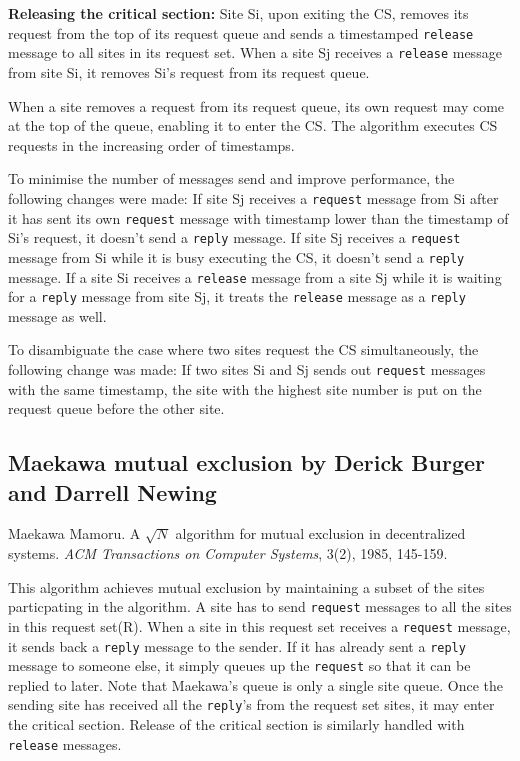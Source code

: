 \documentclass[11pt]{article}
\newcommand{\p}[1]{\texttt{#1}}
\begin{document}
\textbf{Releasing the critical section:}
Site Si, upon exiting the CS, removes its request from the top of its request
queue and sends a timestamped \p{release} message to all sites in its request set.
When a site Sj receives a \p{release} message from site Si, it removes Si's
request from its request queue.

When a site removes a request from its request queue, its own request may
come at the top of the queue, enabling it to enter the CS. The algorithm
executes CS requests in the increasing order of timestamps.

To minimise the number of messages send and improve performance,
the following changes were made:
If site Sj receives a \p{request} message from Si after it has sent its own
\p{request} message with timestamp lower than the timestamp of Si's request,
it doesn't send a \p{reply} message.
If site Sj receives a \p{request} message from Si while it is busy executing
the CS, it doesn't send a \p{reply} message.
If a site Si receives a \p{release} message from a site Sj while it is waiting
for a \p{reply} message from site Sj, it treats the \p{release} message as a \p{reply}
message as well.

To disambiguate the case where two sites request the CS simultaneously,
the following change was made:
If two sites Si and Sj sends out \p{request} messages with the same timestamp,
the site with the highest site number is put on the request queue before
the other site.

\subsection{Maekawa mutual exclusion by Derick Burger and Darrell Newing}

Maekawa Mamoru.
A $\sqrt{N}$ algorithm for mutual exclusion in
decentralized systems.
\emph{ACM Transactions on Computer Systems}, 3(2), 1985, 145-159.

This algorithm achieves mutual exclusion by maintaining a subset
of the sites particpating in the algorithm. A site has to send \p{request}
messages to all the sites in this request set(R). When a site in this
request set receives a \p{request} message, it sends back a \p{reply} message
to the sender. If it has already sent a \p{reply} message to someone else,
it simply queues up the \p{request} so that it can be replied to later.
Note that Maekawa's queue is only a single site queue. Once the sending
site has received all the \p{reply}'s from the request set sites, it may
enter the critical section. Release of the critical section is similarly
handled with \p{release} messages.
\end{document}

